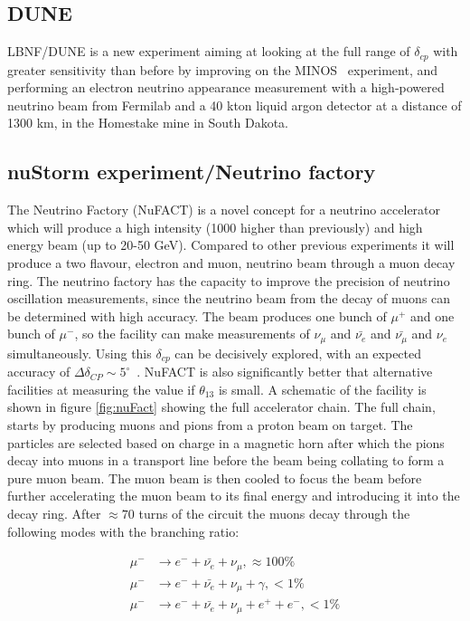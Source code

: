 {
\subsection{DUNE}
LBNF/DUNE\cite{23DUNE} is a new experiment aiming at looking at the full range of $\delta_{cp}$ with greater sensitivity than before by improving on the MINOS~\cite{MINOS} experiment, and performing an electron neutrino appearance measurement with a high-powered neutrino beam from Fermilab and a 40 kton liquid argon detector at a distance of 1300 km, in the Homestake mine in South Dakota.
\fi
\subsection{nuStorm experiment/Neutrino factory}\label{subsec:nuFACT}
The Neutrino Factory (NuFACT) is a novel concept for a neutrino accelerator which will produce a high intensity (1000 higher than previously) and high energy beam (up to 20-50 GeV). Compared to other previous experiments it will produce a two flavour, electron and muon, neutrino beam through a muon decay ring. The neutrino factory has the capacity to improve the precision of neutrino oscillation measurements, since the neutrino beam from the decay of muons can be determined with high accuracy. The beam produces one bunch of $\mu^+$ and one bunch of $\mu^-$, so the facility can make measurements of $\nu_{\mu}$ and $\bar{\nu_{e}}$ and $\bar{\nu_{\mu}}$ and $\nu_{e}$ simultaneously. Using this $\delta_{cp}$ can be decisively explored, with an expected accuracy of $\Delta \delta_{CP}\sim 5^\circ$~\cite{25NUfact}. NuFACT is also significantly better that alternative facilities at measuring the value if $\theta_{13}$ is small. A schematic of the facility is shown in figure \ref{fig:nuFact} showing the full accelerator chain. The full chain, starts by producing muons and pions from a proton beam on target. The particles are selected based on charge in a magnetic horn after which the pions decay into muons in a transport line before the beam being collating to form a pure muon beam. The muon beam is then cooled to focus the beam before further accelerating the muon beam to its final energy and introducing it into the decay ring. After $\approx 70$ turns of the circuit the muons decay through the following modes with the branching ratio:

\begin{align}
\mu^- &\rightarrow e^- + \bar{\nu_e} + \nu_\mu, \approx 100\% \\
\mu^- &\rightarrow e^- + \bar{\nu_e} + \nu_\mu + \gamma, <1\% \\
\mu^- &\rightarrow e^- + \bar{\nu_e} + \nu_\mu + e^+ + e^-, <1\%
\end{align}

}
